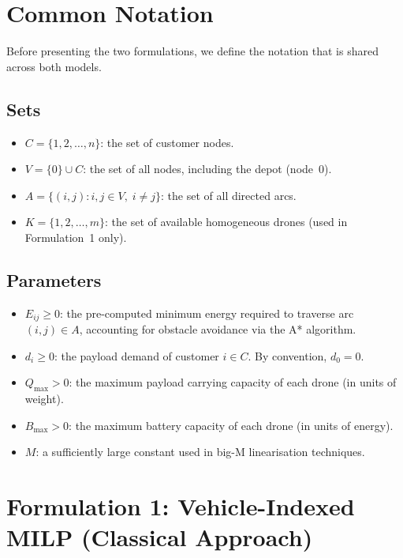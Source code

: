 \documentclass[11pt,a4paper]{article}
\begin{document}
\section{Common Notation}

Before presenting the two formulations, we define the notation that is shared across both models.

\subsection{Sets}
\begin{itemize}
  \item $C = \{1, 2, \ldots, n\}$: the set of customer nodes.
  \item $V = \{0\} \cup C$: the set of all nodes, including the depot (node~$0$).
  \item $A = \{(i,j) : i, j \in V,\; i \neq j\}$: the set of all directed arcs.
  \item $K = \{1, 2, \ldots, m\}$: the set of available homogeneous drones (used in Formulation~1 only).
\end{itemize}

\subsection{Parameters}
\begin{itemize}
  \item $E_{ij} \ge 0$: the pre-computed minimum energy required to traverse arc $(i,j) \in A$, accounting for obstacle avoidance via the A* algorithm.
  \item $d_i \ge 0$: the payload demand of customer $i \in C$. By convention, $d_0 = 0$.
  \item $Q_{\max} > 0$: the maximum payload carrying capacity of each drone (in units of weight).
  \item $B_{\max} > 0$: the maximum battery capacity of each drone (in units of energy).
  \item $M$: a sufficiently large constant used in big-M linearisation techniques.
\end{itemize}

\section{Formulation 1: Vehicle-Indexed MILP (Classical Approach)}
\end{document}
